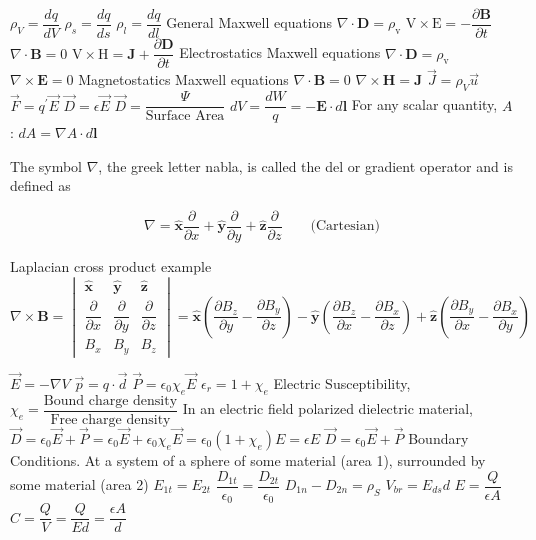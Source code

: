 \documentclass{book}
\begin{document}
\begin{outline}
	\1 $\rho_V = \dfrac{dq}{dV}$
	\1 $\rho_s = \dfrac{dq}{ds}$
	\1 $\rho_l = \dfrac{dq}{dl}$
	\1 General Maxwell equations
	\2 $\nabla\cdot\mathbf{D}  =\rho_{\mathrm{v}}$
	\2 $\mathrm{V \times E}  =-\dfrac{\partial\mathbf{B}}{\partial t}$
	\2 $\nabla\cdot\mathbf{B}  =0$
	\2 $\mathrm{V \times H}  =\mathbf{J}+\dfrac{\partial\mathbf{D}}{\partial t}$
	\1 Electrostatics Maxwell equations
	\2 $\nabla \cdot \mathbf{D} = \rho_{\mathrm{v}}$
	\2 $\nabla \times \mathbf{E} = 0$
	\1 Magnetostatics Maxwell equations
	\2 $\nabla \cdot \mathbf{B} = 0$
	\2 $\nabla \times \mathbf{H} = \mathbf{J}$
	\1 $\vec{J} = \rho_V \vec{u}$
	\1 $\vec{F} = q^\prime \vec{E}$
	\1 $\vec{D} = \epsilon \vec{E}$
	\1 $\vec{D} = \dfrac{\Psi}{\text{Surface Area}}$
	\1 $dV = \dfrac{dW}{q} = -\mathbf{E} \cdot d\mathbf{l}$
	\1 For any scalar quantity, $A$:
	$dA = \nabla A \cdot d\mathbf{l}$

	The symbol  $\nabla$, the greek letter nabla,  is called the del or gradient operator and is defined as

	$$\nabla = \hat{\mathbf{x}} \dfrac{\partial}{\partial x} + \hat{\mathbf{y}} \dfrac{\partial}{\partial y} + \hat{\mathbf{z}} \dfrac{\partial}{\partial z} \qquad \text{(Cartesian)}$$

	\1 Laplacian cross product example
	\begin{equation*}
		\nabla \times \mathbf{B} =
		\begin{vmatrix}
			\mathbf{\hat{x}}             & \mathbf{\hat{y}}             & \mathbf{\hat{z}}             \\
			\dfrac{\partial}{\partial x} & \dfrac{\partial}{\partial y} & \dfrac{\partial}{\partial z} \\
			B_x                          & B_y                          & B_z
		\end{vmatrix}
		= \mathbf{\hat{x}} \left( \dfrac{\partial B_z}{\partial y} - \dfrac{\partial B_y}{\partial z} \right) - \mathbf{\hat{y}} \left( \dfrac{\partial B_z}{\partial x} - \dfrac{\partial B_x}{\partial z} \right) + \mathbf{\hat{z}} \left( \dfrac{\partial B_y}{\partial x} - \dfrac{\partial B_x}{\partial y} \right)
	\end{equation*}

	\1 $\vec{E} = - \nabla V$
	\1 $\vec{p} = q \cdot \vec{d}$
	\1 $\vec{P} = \epsilon_0 \chi_e \vec{E}$
	\1 $\epsilon_r = 1+\chi_e$
	\1 Electric Susceptibility, $\chi_e = \dfrac{\text{Bound charge density}}{\text{Free charge density}}$
	\1 In an electric field polarized dielectric material, $\vec{D} = \epsilon_0 \vec{E} + \vec{P} = \epsilon_0 \vec{E} +  \epsilon_0 \chi_e \vec{E} = \epsilon_0 (1+\chi_e)E = \epsilon E$
	\2 $\vec{D} = \epsilon_0 \vec{E} + \vec{P}$
	\1 Boundary Conditions. At a system of a sphere of some material (area 1), surrounded by some material (area 2)
	\2 $E_{1t} = E_{2t}$
	\2 $\dfrac{D_{1t}}{\epsilon_0} = \dfrac{D_{2t}}{\epsilon_0}$
	\2 $D_{1n} - D_{2n} = \rho_S$
	\1 $V_{br} = E_{ds}d$
	\1 $E = \dfrac{Q}{\epsilon A}$
	\1 $C = \dfrac{Q}{V} = \dfrac{Q}{Ed} = \dfrac{\epsilon A}{d}$
\end{outline}
\end{document}

